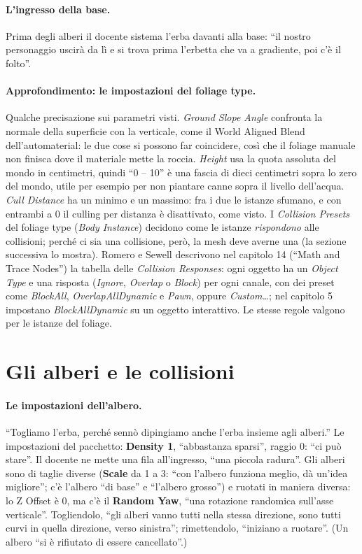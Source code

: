 \paragraph{L'ingresso della base.} Prima degli alberi il docente sistema l'erba davanti alla
base: ``il nostro personaggio uscirà da lì e si trova prima l'erbetta che va a gradiente, poi
c'è il folto''.

\paragraph{Approfondimento: le impostazioni del foliage type.} Qualche precisazione sui
parametri visti. \emph{Ground Slope Angle} confronta la normale della superficie con la
verticale, come il World Aligned Blend dell'automaterial: le due cose si possono far
coincidere, così che il foliage manuale non finisca dove il materiale mette la roccia.
\emph{Height} usa la quota assoluta del mondo in centimetri, quindi ``0 -- 10'' è una fascia di
dieci centimetri sopra lo zero del mondo, utile per esempio per non piantare canne sopra il
livello dell'acqua. \emph{Cull Distance} ha un minimo e un massimo: fra i due le istanze
sfumano, e con entrambi a 0 il culling per distanza è disattivato, come visto. I
\emph{Collision Presets} del foliage type (\emph{Body Instance}) decidono come le istanze
\emph{rispondono} alle collisioni; perché ci sia una collisione, però, la mesh deve averne una
(la sezione successiva lo mostra). Romero e Sewell descrivono nel capitolo 14 (``Math and
Trace Nodes'') la tabella delle \emph{Collision Responses}: ogni oggetto ha un \emph{Object
Type} e una risposta (\emph{Ignore}, \emph{Overlap} o \emph{Block}) per ogni canale, con dei
preset come \emph{BlockAll}, \emph{OverlapAllDynamic} e \emph{Pawn}, oppure
\emph{Custom\ldots}; nel capitolo 5 impostano \emph{BlockAllDynamic} su un oggetto
interattivo. Le stesse regole valgono per le istanze del foliage.

\section{Gli alberi e le collisioni}
\label{ue15:sec:alberi}

\paragraph{Le impostazioni dell'albero.} ``Togliamo l'erba, perché sennò dipingiamo anche
l'erba insieme agli alberi.'' Le impostazioni del pacchetto: \textbf{Density 1}, ``abbastanza
sparsi'', raggio 0: ``ci può stare''. Il docente ne mette una fila all'ingresso, ``una piccola
radura''. Gli alberi sono di taglie diverse (\textbf{Scale} da 1 a 3: ``con l'albero funziona
meglio, dà un'idea migliore''; c'è l'albero ``di base'' e ``l'albero grosso'') e ruotati in
maniera diversa: lo Z Offset è 0, ma c'è il \textbf{Random Yaw}, ``una rotazione randomica
sull'asse verticale''. Togliendolo, ``gli alberi vanno tutti nella stessa direzione, sono tutti
curvi in quella direzione, verso sinistra''; rimettendolo, ``iniziano a ruotare''. (Un albero
``si è rifiutato di essere cancellato''.)

